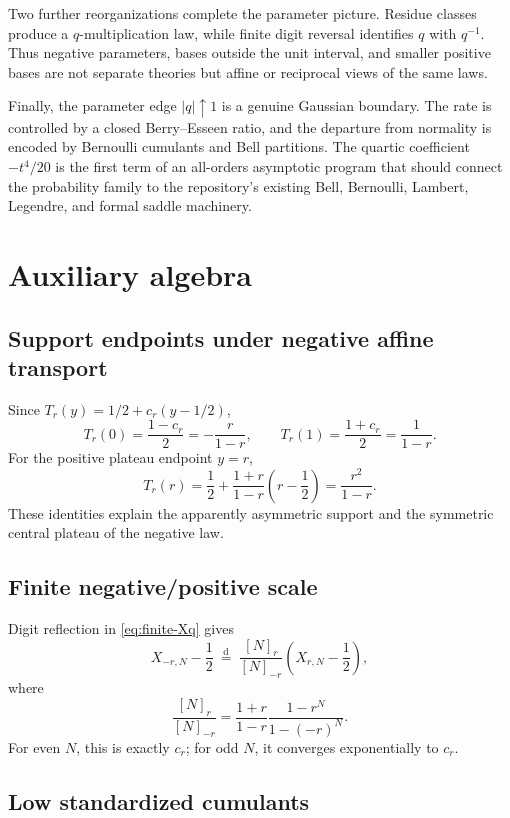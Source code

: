 \documentclass[11pt]{article}
\theoremstyle{definition}
\newcommand{\doteqL}{\mathrel{\stackrel{\mathrm d}=}}
\begin{document}
Two further reorganizations complete the parameter picture.  Residue classes produce a
$q$-multiplication law, while finite digit reversal identifies \(q\) with \(q^{-1}\).
Thus negative parameters, bases outside the unit interval, and smaller positive bases
are not separate theories but affine or reciprocal views of the same laws.

Finally, the parameter edge \(\lvert q\rvert\uparrow1\) is a genuine Gaussian boundary.
The rate is controlled by a closed Berry--Esseen ratio, and the departure from normality
is encoded by Bernoulli cumulants and Bell partitions.  The quartic coefficient
\(-t^4/20\) is the first term of an all-orders asymptotic program that should connect the
probability family to the repository's existing Bell, Bernoulli, Lambert, Legendre, and
formal saddle machinery.

\appendix
\section{Auxiliary algebra}

\subsection{Support endpoints under negative affine transport}

Since \(T_r(y)=1/2+c_r(y-1/2)\),
\[
 T_r(0)=\frac{1-c_r}{2}=-\frac r{1-r},
 \qquad
 T_r(1)=\frac{1+c_r}{2}=\frac1{1-r}.
\]
For the positive plateau endpoint \(y=r\),
\[
 T_r(r)=\frac12+\frac{1+r}{1-r}\left(r-\frac12\right)
 =\frac{r^2}{1-r}.
\]
These identities explain the apparently asymmetric support and the symmetric central
plateau of the negative law.

\subsection{Finite negative/positive scale}

Digit reflection in \cref{eq:finite-Xq} gives
\[
 X_{-r,N}-\frac12\ \doteqL\
 \frac{[N]_r}{[N]_{-r}}\left(X_{r,N}-\frac12\right),
\]
where
\[
 \frac{[N]_r}{[N]_{-r}}
 =\frac{1+r}{1-r}\frac{1-r^N}{1-(-r)^N}.
\]
For even \(N\), this is exactly \(c_r\); for odd \(N\), it converges exponentially to
\(c_r\).

\subsection{Low standardized cumulants}
\end{document}
